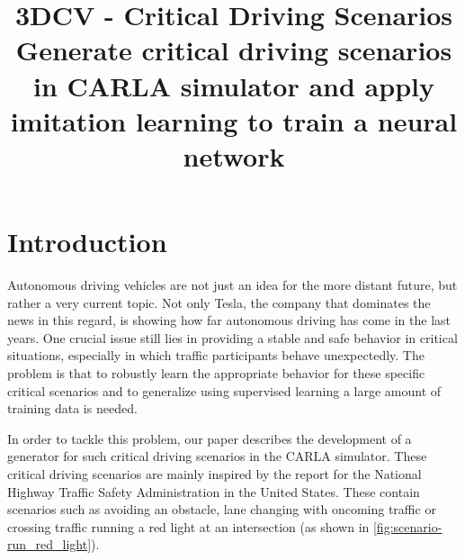 \documentclass[conference, 11pt]{IEEEtran}
\begin{document}
\title{3DCV - Critical Driving Scenarios\\
{\small Generate critical driving scenarios in CARLA simulator and apply imitation learning to train a neural network}
}

\author{
    \and
    \and
    \and
}

\maketitle

\begin{abstract}

\end{abstract}

\begin{IEEEkeywords}

\end{IEEEkeywords}

\section{Introduction}
Autonomous driving vehicles are not just an idea for the more distant future, but rather a very current topic.
Not only Tesla, the company that dominates the news in this regard, is showing how far autonomous driving has come in the last years.
One crucial issue still lies in providing a stable and safe behavior in critical situations, especially in which traffic participants behave unexpectedly. 
The problem is that to robustly learn the appropriate behavior for these specific critical scenarios and to generalize using supervised learning a large amount of training data is needed.

In order to tackle this problem, our paper describes the development of a generator for such critical driving scenarios in the CARLA simulator.
These critical driving scenarios are mainly inspired by the report  \cite{NHTSA:PreCrashScenarios} for the National Highway Traffic Safety Administration in the United States.
These contain scenarios such as avoiding an obstacle, lane changing with oncoming traffic or crossing traffic running a red light at an intersection (as shown in \autoref{fig:scenario-run_red_light}).
\end{document}
